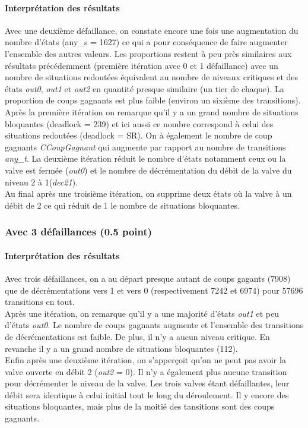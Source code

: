 \documentclass[a4paper]{book}
\begin{document}
\paragraph{Interprétation des résultats}
Avec une deuxième défaillance, on constate encore une fois une augmentation du nombre d'états (any\_s = 1627) ce qui a pour conséquence de faire augmenter l'ensemble 
des autres valeurs. Les proportions restent à peu près similaires aux résultats précédemment (première itération avec 0 et 1 défaillance) avec un nombre de situations 
redoutées équivalent au nombre de niveaux critiques et des états  \textit{out0},  \textit{out1} et  \textit{out2} en quantité presque similaire (un tier de chaque). La proportion de coups gagnants est plus faible (environ un sixième des 
transitions). \\
Après la première itération on remarque qu'il y a un grand nombre de situations bloquantes (deadlock = 239) et ici aussi ce nombre correspond à celui des 
situations redoutées (deadlock = SR). On à également le nombre de coup gagnants \textit{CCoupGagnant} qui augmente par rapport au nombre de transitions \textit{any\_t}. 
La deuxième itération réduit le nombre d'états notamment ceux ou la valve est fermée (\textit{out0}) et le nombre de décrémentation du débit de la valve du niveau 2 à 
1(\textit{dec21}). \\
Au final après une troisième itération, on supprime deux états où la valve à un débit de 2 ce qui réduit de 1 le nombre de situations bloquantes.

\subsubsection{Avec 3 défaillances (0.5 point)}




%
\paragraph{Interprétation des résultats}
Avec trois défaillances, on a au départ presque autant de coups gagants (7908) que de décrémentations vers 1 et vers 0 (respectivement 7242 et 6974) pour 57696 transitions en tout.\\
Après une itération, on remarque qu'il y a une majorité d'états \textit{out1} et peu d'états \textit{out0}. Le nombre de coups gagnants augmente et l'ensemble des transitions 
de décrémentations est faible. De plus, il n'y a aucun niveau critique. En revanche il y a un grand nombre de situations bloquantes (112). \\
Enfin après une deuxième itération, on s'apperçoit qu'on ne peut pas avoir la valve ouverte en débit 2 (\textit{out2} = 0). Il n'y a également plus aucune transition pour 
décrémenter le niveau de la valve. Les trois valves étant défaillantes, leur débit sera identique à celui initial tout le long du déroulement. Il y encore des situations 
bloquantes, mais plus de la moitié des tansitions sont des coups gagnants.
\end{document}
